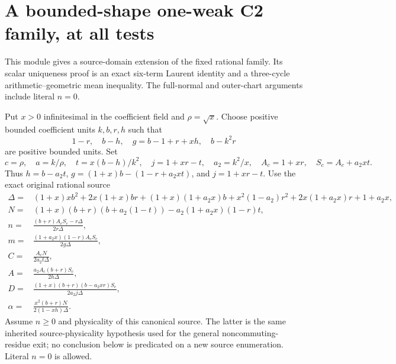\section{A bounded-shape one-weak C2 family, at all tests}
\label{sec:c2-general-single-angle}

This module gives a source-domain extension of the fixed rational
family.  Its scalar uniqueness proof is an exact six-term Laurent
identity and a three-cycle arithmetic--geometric mean inequality.
The full-normal and outer-chart arguments include literal $n=0$.

Put $x>0$ infinitesimal in the coefficient field and $\rho=\sqrt{x}$.
Choose positive bounded coefficient units $k,b,r,h$ such that
\[
 1-r,\quad b-h,\quad g=b-1+r+xh,\quad b-k^2r
\]
are positive bounded units.  Set
\[
 c=\rho,\quad a=k/\rho,\quad t=x(b-h)/k^2,
 \quad j=1+xr-t,\quad a_2=k^2/x,
 \quad A_c=1+xr,\quad S_c=A_c+a_2xt.
\]
Thus $h=b-a_2t$, $g=(1+x)b-(1-r+a_2xt)$, and $j=1+xr-t$.
Use the exact original rational source
\begin{align*}
 \Delta={}&(1+x)xb^2+2x(1+x)br+(1+x)(1+a_2x)b
       +x^2(1-a_2)r^2+2x(1+a_2x)r+1+a_2x,\\
 N={}&(1+x)(b+r)(b+a_2(1-t))-a_2(1+a_2x)(1-r)t,\\
 n={}&\frac{(b+r)A_cS_c-r\Delta}{2r\Delta},\\
 m={}&\frac{(1+a_2x)(1-r)A_cS_c}{2g\Delta},\\
 C={}&\frac{A_cN}{2a_2t\Delta},\\
 A={}&\frac{a_2A_c(b+r)S_c}{2h\Delta},\\
 D={}&\frac{(1+x)(b+r)(b-a_2xr)S_c}{2a_2j\Delta},\\
 \alpha={}&\frac{x^2(b+r)N}{2(1-xh)\Delta}.
\end{align*}
Assume $n\geq0$ and physicality of this canonical source.  The latter
is the same inherited source-physicality hypothesis used for the
general noncommuting-residue exit; no conclusion below is predicated
on a new source enumeration.  Literal $n=0$ is allowed.

